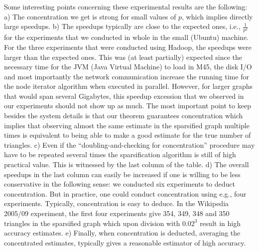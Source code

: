 \documentclass{llncs}
\begin{document}
Some interesting points concerning these experimental results are the following:
a) The concentration we get is strong for small values of $p$, which implies directly large speedups.
b) The speedups typically are close to the expected ones, i.e., $\frac{1}{p^2}$ for the experiments
that we conducted in whole in the small (Ubuntu) machine. For the three experiments that were conducted
using Hadoop, the speedups were larger than the expected ones. This was (at least partially) expected since the necessary time for the JVM
(Java Virtual Machine) to load in M45, the disk I/O and most importantly the network communication
increase the running time for the node iterator algorithm when executed in parallel. 
However, for larger graphs that would span several Gigabytes, 
this speedup excession that we observed in our experiments should not show up as much.
The most important point to keep besides the system details is that our theorem guarantees concentration 
which implies that observing almost the same estimate in the sparsified graph multiple times
is equivalent to being able to make a good estimate for the true number of triangles. 
c) Even if the ``doubling-and-checking for concentration'' procedure may have to be repeated several times
the sparsification algorithm is still of high practical value. This is witnessed by the last column 
of the table. 
d) The overall speedups in the last column can easily be increased if one is willing to be less conservative
in the following sense: we conducted six experiments to deduct concentration. But in practice, one could conduct 
concentration using e.g., four experiments. Typically, concentration is easy to deduce. In the Wikipedia 2005/09
experiment, the first four experiments give 354, 349, 348 and 350 triangles in the sparsified graph which 
upon division with $0.02^3$ result in high accuracy estimates.
e) Finally, when concentration is deducted, averaging the concentrated estimates, typically gives a reasonable
estimator of high accuracy.
\end{document}
